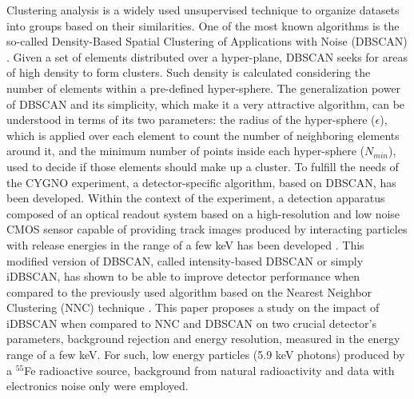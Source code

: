 \documentclass[a4paper,11pt]{article}
\begin{document}
Clustering analysis is a widely used unsupervised technique to organize datasets into groups based on their similarities.
One of the most known algorithms is the so-called Density-Based Spatial Clustering of Applications with Noise (DBSCAN) \cite{dbscan1996}.
Given a set of elements distributed over a hyper-plane, DBSCAN seeks for areas of high density to form clusters. Such density is calculated considering the number of elements within a pre-defined hyper-sphere.
The generalization power of DBSCAN and its simplicity, which make it a very attractive algorithm, can be understood in terms of its two parameters: the radius of the hyper-sphere ($\epsilon$), which is applied over each element to count the number of neighboring elements around it, and the minimum number of points inside each hyper-sphere ($N_{min}$), used to decide if those elements should make up a cluster.
To fulfill the needs of the CYGNO experiment, a detector-specific algorithm, based on DBSCAN, has been developed.
Within the context of the experiment,
a detection apparatus composed of an optical readout system based on a high-resolution and low noise CMOS sensor capable of providing track images produced by interacting particles with release energies in the range of a few keV has been developed \cite{bib:ref1,bib:ref2,bib:ref3,bib:ref4,bib:nim_orange1,bib:jinst_orange2}.
This modified version of DBSCAN, called intensity-based DBSCAN or simply iDBSCAN,
has shown to be able to improve detector performance when compared to the previously used algorithm based on the Nearest Neighbor Clustering (NNC) technique \cite{bib:fe55}.
This paper proposes a study on the impact of iDBSCAN when compared to NNC and DBSCAN on two crucial detector's parameters, background rejection and energy resolution, measured in the energy range of a few keV.
For such, low energy particles (5.9 keV photons) produced by a $^{55}$Fe radioactive source, background from natural radioactivity and data with electronics noise only were employed. 
\end{document}
